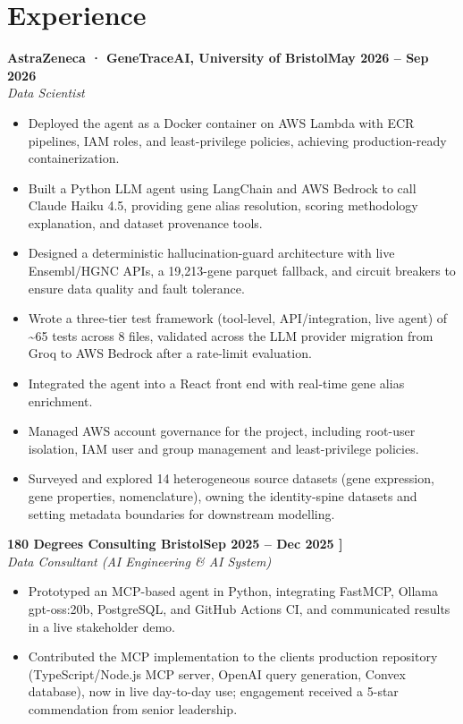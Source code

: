 \documentclass[a4paper,11pt]{article}
\newcommand{\entry}[4]{\needspace{4\baselineskip}\noindent\textbf{#1}\hfill\textbf{#2}\\ \textit{#3}\hfill\textit{#4}\par}
\begin{document}
\section{Experience}
\entry{AstraZeneca · GeneTraceAI, University of Bristol}{May 2026 – Sep 2026}{Data Scientist}{}
\begin{itemize}
  \item Deployed the agent as a Docker container on AWS Lambda with ECR pipelines, IAM roles, and least-privilege policies, achieving production-ready containerization.
  \item Built a Python LLM agent using LangChain and AWS Bedrock to call Claude Haiku 4.5, providing gene alias resolution, scoring methodology explanation, and dataset provenance tools.
  \item Designed a deterministic hallucination-guard architecture with live Ensembl/HGNC APIs, a 19,213-gene parquet fallback, and circuit breakers to ensure data quality and fault tolerance.
  \item Wrote a three-tier test framework (tool-level, API/integration, live agent) of \textasciitilde{}65 tests across 8 files, validated across the LLM provider migration from Groq to AWS Bedrock after a rate-limit evaluation.
  \item Integrated the agent into a React front end with real-time gene alias enrichment.
  \item Managed AWS account governance for the project, including root-user isolation, IAM user and group management and least-privilege policies.
  \item Surveyed and explored 14 heterogeneous source datasets (gene expression, gene properties, nomenclature), owning the identity-spine datasets and setting metadata boundaries for downstream modelling.
\end{itemize}
\vspace{4pt}
\entry{180 Degrees Consulting Bristol}{Sep 2025 – Dec 2025   ]}{Data Consultant (AI Engineering \& AI System)}{}
\begin{itemize}
  \item Prototyped an MCP-based agent in Python, integrating FastMCP, Ollama gpt-oss:20b, PostgreSQL, and GitHub Actions CI, and communicated results in a live stakeholder demo.
  \item Contributed the MCP implementation to the client\textquotesingle{}s production repository (TypeScript/Node.js MCP server, OpenAI query generation, Convex database), now in live day-to-day use; engagement received a 5-star commendation from senior leadership.
\end{itemize}
\end{document}
